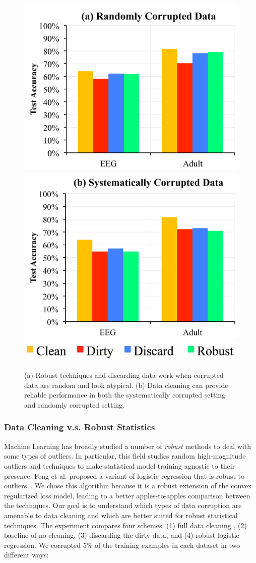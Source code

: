 \begin{figure}[t]
\centering
 \includegraphics[width=0.49\columnwidth]{exp/exp2.pdf}
 \includegraphics[width=0.49\columnwidth]{exp/exp1.pdf}
 \includegraphics[width=0.5\columnwidth]{exp/legend-1.png}\vspace{-1em}
 \caption{(a) Robust techniques and discarding data work when corrupted data are random and look atypical. (b) Data cleaning can provide reliable performance in both the systematically corrupted setting and randomly corrupted setting.\label{sys-rand}}\vspace{-1.5em}
\end{figure}

\subsubsection{Data Cleaning v.s. Robust Statistics}
Machine Learning has broadly studied a number of \emph{robust} methods to deal with some types of outliers. In particular, this field studies random high-magnitude outliers and techniques to make statistical model training agnostic to their presence. Feng et al. proposed a variant of logistic regression that is robust to outliers~\cite{feng2014robust}. We chose this algorithm because it is a robust extension of the convex regularized loss model, leading to a better apples-to-apples comparison between the techniques.
Our goal is to understand which types of data corruption are amenable to data cleaning and which are better suited for robust statistical techniques.
The experiment compares four schemes: (1) full data cleaning  , (2) baseline of no cleaning, (3) discarding the dirty data, and (4) robust logistic regression. 
We corrupted 5\% of the training examples in each dataset in two different ways:

